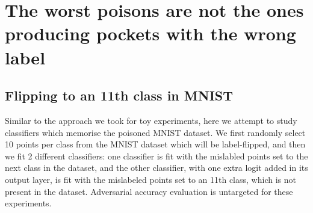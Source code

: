 \documentclass{ociamthesis}
\begin{document}



\section{The worst poisons are not the ones producing pockets with the wrong label}


\subsection{Flipping to an 11th class in MNIST}

Similar to the approach we took for toy experiments, here we attempt to study
classifiers which memorise the poisoned MNIST dataset. We first randomly select
10 points per class from the MNIST dataset which will be label-flipped, and then
we fit 2 different classifiers: one classifier is fit with the mislabled points
set to the next class in the dataset, and the other classifier, with one extra
logit added in its output layer, is fit with the mislabeled points set to an
11th class, which is not present in the dataset. Adversarial accuracy evaluation
is untargeted for these experiments.
\end{document}
